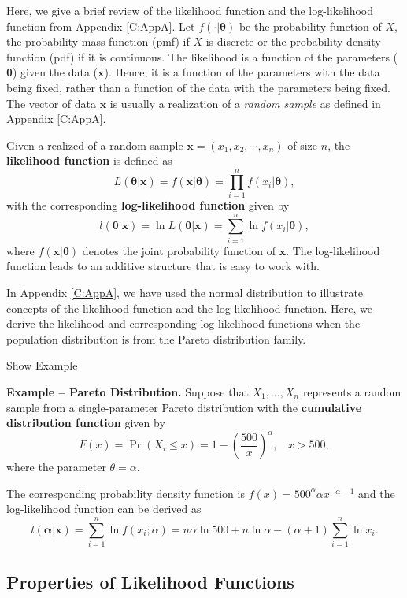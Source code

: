 \documentclass[]{book}
\theoremstyle{definition}
\theoremstyle{definition}
\theoremstyle{definition}
\theoremstyle{remark}
\begin{document}
Here, we give a brief review of the likelihood function and the
log-likelihood function from Appendix \ref{C:AppA}. Let
\(f(\cdot|\boldsymbol\theta)\) be the probability function of \(X\), the
probability mass function (pmf) if \(X\) is discrete or the probability
density function (pdf) if it is continuous. The likelihood is a function
of the parameters (\(\boldsymbol \theta\)) given the data
(\(\mathbf{x}\)). Hence, it is a function of the parameters with the
data being fixed, rather than a function of the data with the parameters
being fixed. The vector of data \(\mathbf{x}\) is usually a realization
of a \emph{random sample} as defined in Appendix \ref{C:AppA}.

Given a realized of a random sample \(\mathbf{x}=(x_1,x_2,\cdots,x_n)\)
of size \(n\), the \textbf{likelihood function} is defined as
\[L(\boldsymbol{\theta}|\mathbf{x})=f(\mathbf{x}|\boldsymbol{\theta})=\prod_{i=1}^nf(x_i|\boldsymbol{\theta}),\]
with the corresponding \textbf{log-likelihood function} given by
\[l(\boldsymbol{\theta}|\mathbf{x})=\ln L(\boldsymbol{\theta}|\mathbf{x})=\sum_{i=1}^n\ln f(x_i|\boldsymbol{\theta}),\]
where \(f(\mathbf{x}|\boldsymbol{\theta})\) denotes the joint
probability function of \(\mathbf{x}\). The log-likelihood function
leads to an additive structure that is easy to work with.

In Appendix \ref{C:AppA}, we have used the normal distribution to
illustrate concepts of the likelihood function and the log-likelihood
function. Here, we derive the likelihood and corresponding
log-likelihood functions when the population distribution is from the
Pareto distribution family.

Show Example

\hypertarget{EXM:S2b:LLK}{}
\textbf{Example -- Pareto Distribution.} Suppose that
\(X_1, \ldots, X_n\) represents a random sample from a single-parameter
Pareto distribution with the \textbf{cumulative distribution function}
given by
\[F(x) = \Pr(X_i\leq x)=1- \left(\frac{500}{x}\right)^{\alpha}, ~~~~ x>500,\]
where the parameter \(\theta = \alpha\).

The corresponding probability density function is
\(f(x) = 500^{\alpha} \alpha x^{-\alpha-1}\) and the log-likelihood
function can be derived as
\[l(\boldsymbol \alpha|\mathbf{x}) = \sum_{i=1}^n \ln f(x_i;\alpha) = n \alpha \ln 500 +n \ln \alpha -(\alpha+1)  \sum_{i=1}^n \ln x_i .\]

\subsection{Properties of Likelihood
Functions}\label{properties-of-likelihood-functions}
\end{document}
